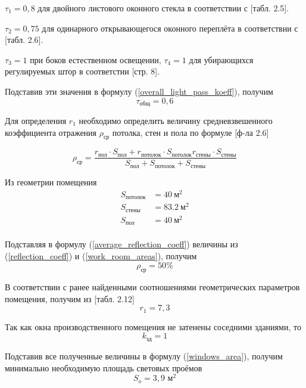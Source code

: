 $\tau_1 = 0,8$ для двойного листового оконного стекла в соответствии с
\cite{lighting_calc_method}[табл. 2.5].

$\tau_2 = 0,75$ для одинарного открывающегося оконного переплёта в соответствии с
\cite{lighting_calc_method}[табл. 2.6].

$\tau_3 = 1$ при боков естественном освещении, $\tau_4 = 1$ для убирающихся
регулируемых штор  в соответстии \cite{lighting_calc_method}[стр. 8].

Подставив эти значения в формулу (\ref{overall_light_pass_koeff}), получим
$$
    \tau_\text{общ} = 0,6
$$

Для определения $r_1$ необходимо определить величину средневзвешенного коэффициента
отражения $\rho_\text{ср}$ потолка, стен и пола по формуле
\cite{lighting_calc_method}[ф-ла 2.6]

\begin{equation}
    \rho_\text{ср} = \frac{ r_\text{пол} \cdot S_\text{пол}
                            + r_\text{потолок} \cdot S_\text{потолок}
                            r_\text{стены} \cdot S_\text{стены}}
                            {S_\text{пол} + S_\text{потолок} + S_\text{стены}}
    \label{average_reflection_coeff}
\end{equation}

Из геометрии помещения
\begin{equation}
    \begin{array}{ll}
        S_\text{потолок}    & = 40 ~\text{м}^2      \\
        S_\text{стены}      & = 83.2 ~\text{м}^2    \\
        S_\text{пол}        & = 40 ~\text{м}^2      \\
    \end{array}
    \label{work_room_areas}
\end{equation}

Подставляя в формулу (\ref{average_reflection_coeff}) величины из (\ref{reflection_coeff})
и (\ref{work_room_areas}), получим
$$
    \rho_\text{ср} = 50 \%
$$

В соответствии с ранее найденными соотношениями геометрических параметров помещения,
получим из \cite{lighting_calc_method}[табл. 2.12]
$$
    r_1 = 7,3
$$

Так как окна производственного помещения не затенены соседними зданиями, то
$$
    k_\text{зд} = 1
$$

Подставив все полученные величины в формулу (\ref{windows_area}), получим
минимально необходимую площадь световых проёмов
$$
    S_o = 3,9 \text{ м}^2
$$

